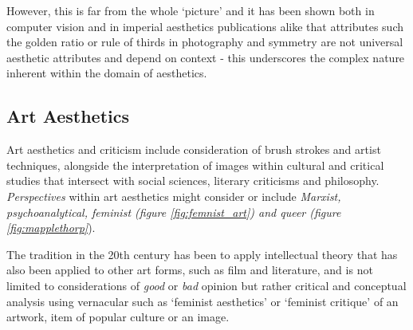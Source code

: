\par

However, this is far from the whole `picture' and it has been shown both in computer vision \cite{Simond2015} and in imperial aesthetics publications alike that attributes such the golden ratio or rule of thirds in photography\cite{Green2012} and symmetry\cite{Leder2019} are not universal aesthetic attributes and depend on context - this underscores the complex nature inherent within the domain of aesthetics. 



\subsection{Art Aesthetics}

Art aesthetics and criticism include consideration of brush strokes and artist techniques, alongside the interpretation of images within cultural and critical studies that intersect with social sciences, literary criticisms and philosophy. \textit{Perspectives} within art aesthetics might consider or include \textit{Marxist, psychoanalytical, feminist (figure \ref{fig:femnist_art}) and queer (figure \ref{fig:mapplethorp}}). 

\par The tradition in the 20th century has been to apply intellectual theory that has also been applied to other art forms, such as film and literature, and is not limited to considerations of \textit{good} or \textit{bad} opinion but rather critical and conceptual analysis using vernacular such as `feminist aesthetics' or `feminist critique'\cite{Hein1990} of an artwork, item of popular culture or an image.

